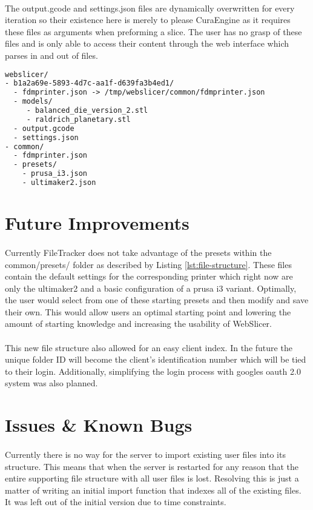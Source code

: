 \paragraph{}
The output.gcode and settings.json files are dynamically overwritten for every iteration so their existence here is merely to please CuraEngine as it requires these files as arguments when preforming a slice. 
The user has no grasp of these files and is only able to access their content through the web interface which parses in and out of files.

\begin{lstlisting}[language=html, style=thesiscode, label={lst:file-structure}, caption=WebSlicer's underlying file structure supported by FileTracker.]
webslicer/
- b1a2a69e-5893-4d7c-aa1f-d639fa3b4ed1/
  - fdmprinter.json -> /tmp/webslicer/common/fdmprinter.json
  - models/
     - balanced_die_version_2.stl
     - raldrich_planetary.stl
  - output.gcode
  - settings.json
- common/
  - fdmprinter.json
  - presets/
    - prusa_i3.json
    - ultimaker2.json
\end{lstlisting}

\section{Future Improvements}
\paragraph{}
Currently FileTracker does not take advantage of the presets within the common/presets/ folder as described by Listing \ref{lst:file-structure}. 
These files contain the default settings for the corresponding printer which right now are only the ultimaker2 and a basic configuration of a prusa i3 variant. 
Optimally, the user would select from one of these starting presets and then modify and save their own.
This would allow users an optimal starting point and lowering the amount of starting knowledge and increasing the usability of WebSlicer.

\paragraph{}
This new file structure also allowed for an easy client index. 
In the future the unique folder ID will become the client's identification number which will be tied to their login. 
Additionally, simplifying the login process with googles oauth 2.0 system was also planned.

\section{Issues \& Known Bugs}
\paragraph{}
Currently there is no way for the server to import existing user files into its structure.
This means that when the server is restarted for any reason that the entire supporting file structure with all user files is lost.
Resolving this is just a matter of writing an initial import function that indexes all of the existing files.
It was left out of the initial version due to time constraints.
